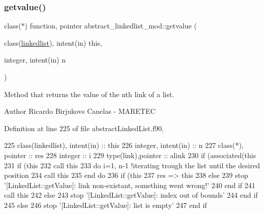 \subsubsection{\texorpdfstring{getvalue()}{getvalue()}}
{\footnotesize\ttfamily class($\ast$) function, pointer abstract\+\_\+linkedlist\+\_\+mod\+::getvalue (\begin{DoxyParamCaption}\item[{class(\mbox{\hyperlink{structabstract__linkedlist__mod_1_1linkedlist}{linkedlist}}), intent(in)}]{this,  }\item[{integer, intent(in)}]{n }\end{DoxyParamCaption})\hspace{0.3cm}{\ttfamily [private]}}



Method that returns the value of the nth link of a list. 

\begin{DoxyAuthor}{Author}
Ricardo Birjukovs Canelas -\/ M\+A\+R\+E\+T\+EC 
\end{DoxyAuthor}


Definition at line 225 of file abstract\+Linked\+List.\+f90.


\begin{DoxyCode}
225     \textcolor{keywordtype}{class}(linkedlist), \textcolor{keywordtype}{intent(in)} :: this
226     \textcolor{keywordtype}{integer}, \textcolor{keywordtype}{intent(in)} :: n
227     \textcolor{keywordtype}{class}(*), \textcolor{keywordtype}{pointer} :: res
228     \textcolor{keywordtype}{integer} :: i
229     \textcolor{keywordtype}{type}(link),\textcolor{keywordtype}{pointer} :: alink
230     \textcolor{keywordflow}{if} (\textcolor{keyword}{associated}(this%
231         \textcolor{keywordflow}{if} (this%
232             \textcolor{keyword}{call }this%
233             \textcolor{keywordflow}{do} i=1, n-1    \textcolor{comment}{!iterating trough the list until the desired position            }
234                 \textcolor{keyword}{call }this%
235 \textcolor{keywordflow}{            end do}
236             \textcolor{keywordflow}{if} (this%
237             res => this%
238             \textcolor{keywordflow}{else}
239                 stop \textcolor{stringliteral}{'[LinkedList::getValue]: link non-existant, something went wrong!'}
240 \textcolor{keywordflow}{            end if}
241             \textcolor{keyword}{call }this%
242         \textcolor{keywordflow}{else}
243             stop \textcolor{stringliteral}{'[LinkedList::getValue]: index out of bounds'}
244 \textcolor{keywordflow}{        end if}
245     \textcolor{keywordflow}{else}
246         stop \textcolor{stringliteral}{'[LinkedList::getValue]: list is empty'}
247 \textcolor{keywordflow}{    end if}
\end{DoxyCode}
\mbox{\label{namespaceabstract__linkedlist__mod_a91ec7f6e570a87769ebb3d11b33f577e}} 
